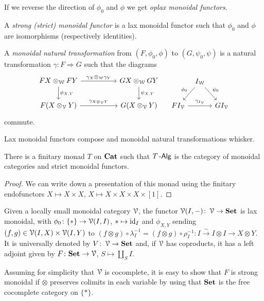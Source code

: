 \documentclass[a4paper,11pt,oneside,openany]{scrbook}
\begin{document}
\begin{defn}
    If we reverse the direction of $\phi_0$ and $\phi$ we get \emph{oplax monoidal functors}.
    
    A \emph{strong (strict) monoidal functor} is a lax monoidal functor such that $\phi_0$ and $\phi$ are isomorphisms (respectively identities).
    
    A \emph{monoidal natural transformation} from $(F,\phi_0,\phi)$ to $(G,\psi_0,\psi)$ is a natural transformation $\gamma\colon F\Rightarrow G$ such that the diagrams
    \[
    \begin{tikzcd}[column sep=5.0em]
        FX\otimes_{\W}FY\ar[r, "\gamma_X\otimes_{\W}\gamma_Y"]\ar[d, "\phi_{X,Y}"]
        & GX\otimes_{\W}GY\ar[d, "\psi_{X,Y}"] \\
        F(X\otimes_{\V}Y)\ar[r, "\gamma_{X\otimes_{\V}Y}"]
        & G(X\otimes_{\V}Y)
    \end{tikzcd}
    \quad
    \begin{tikzcd}[column sep=tiny]
        & I_{\W}\ar[dl, "\phi_0", swap]\ar[dr, "\psi_0"] \\
        FI_{\V}\ar[rr, "\gamma_{I_{\V}}"]
        && GI_{\V}
    \end{tikzcd}
    \]
    commute.
\end{defn}

\begin{prop}
    Lax monoidal functors compose and monoidal natural transformations whisker.
\end{prop}

\begin{prop}
    There is a finitary monad $T$ on ${\normalfont\textbf{Cat}}$ such that $T\operatorname{-\mathsf{Alg}}$ is the category of monoidal categories and strict monoidal functors.
\end{prop}

\begin{proof}
    We can write down a presentation of this monad using the finitary endofunctors $X\mapsto X\times X$, $X\mapsto X\times X\times X\times [1]$.
\end{proof}

\begin{exmp}
    Given a locally small monoidal category $\operatorname{\mathcal{V}}$, the functor $\operatorname{\mathcal{V}}(I,-)\colon\operatorname{\mathcal{V}}\rightarrow{\normalfont\textbf{Set}}$ is lax monoidal, with $\phi_0\colon\{*\}\rightarrow\operatorname{\mathcal{V}}(I,I)$, $*\mapsto\operatorname{id}_{I}$ and $\phi_{X,Y}$ sending $(f,g)\in\operatorname{\mathcal{V}}(I,X)\times\operatorname{\mathcal{V}}(I,Y)$ to $(f\otimes g)\circ\lambda_I^{-1}=(f\otimes g)\circ\rho_I^{-1}\colon I\xrightarrow{\sim} I\otimes I\rightarrow X\otimes Y$. It is universally denoted by $V\colon\operatorname{\mathcal{V}}\rightarrow{\normalfont\textbf{Set}}$ and, if $\operatorname{\mathcal{V}}$ has coproducts, it has a left adjoint given by $F\colon{\normalfont\textbf{Set}}\rightarrow\operatorname{\mathcal{V}}$, $S\mapsto\amalg_S I$.
    
    Assuming for simplicity that $\operatorname{\mathcal{V}}$ is cocomplete, it is easy to show that $F$ is strong monoidal if $\otimes$ preserves colimits in each variable by using that ${\normalfont\textbf{Set}}$ is the free cocomplete category on $\{*\}$.
\end{exmp}
\end{document}
